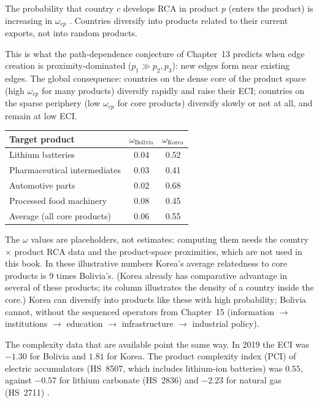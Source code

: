 \documentclass[../structural_economics_book.tex]{subfiles}
\begin{document}
\begin{stylizedfact}\label{ch16:prop:relatedness_global}
The probability that country $c$ develops RCA in product $p$ (enters the product) is increasing in $\omega_{cp}$ \citep{hidalgo2007product}. Countries diversify into products related to their current exports, not into random products.
\end{stylizedfact}

This is what the path-dependence conjecture of Chapter~13 predicts when edge creation is proximity-dominated ($p_1 \gg p_2, p_3$): new edges form near existing edges. The global consequence: countries on the dense core of the product space (high $\omega_{cp}$ for many products) diversify rapidly and raise their ECI; countries on the sparse periphery (low $\omega_{cp}$ for core products) diversify slowly or not at all, and remain at low ECI.

\begin{example}\label{ch16:ex:relatedness}
\begin{center}
\begin{tabular}{lcc}
\toprule
Target product & $\omega_{\text{Bolivia}}$ & $\omega_{\text{Korea}}$ \\
\midrule
Lithium batteries & 0.04 & 0.52 \\
Pharmaceutical intermediates & 0.03 & 0.41 \\
Automotive parts & 0.02 & 0.68 \\
Processed food machinery & 0.08 & 0.45 \\
\midrule
Average (all core products) & 0.06 & 0.55 \\
\bottomrule
\end{tabular}
\end{center}

The $\omega$ values are placeholders, not estimates: computing them needs the country $\times$ product RCA data and the product-space proximities, which are not used in this book. In these illustrative numbers Korea's average relatedness to core products is 9 times Bolivia's. (Korea already has comparative advantage in several of these products; its column illustrates the density of a country inside the core.) Korea can diversify into products like these with high probability; Bolivia cannot, without the sequenced operators from Chapter~15 (information $\to$ institutions $\to$ education $\to$ infrastructure $\to$ industrial policy).

The complexity data that are available point the same way. In 2019 the ECI was $-1.30$ for Bolivia and $1.81$ for Korea. The product complexity index (PCI) of electric accumulators (HS~8507, which includes lithium-ion batteries) was $0.55$, against $-0.57$ for lithium carbonate (HS~2836) and $-2.23$ for natural gas (HS~2711) \citep{growthlab2026atlas}.
\end{example}
\end{document}
